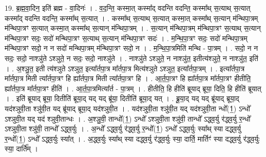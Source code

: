 \documentclass[17pt]{extarticle}
\begin{document}
19. ब्र॒ह्म॒वा॒दिन॒ इति॑ ब्रह्म - वा॒दिनः॑ । . व॒द॒न्ति॒ कस्मा॒त् कस्मा᳚द् वदन्ति वदन्ति॒ कस्मा᳚थ् स॒त्याथ् स॒त्यात् कस्मा᳚द् वदन्ति वदन्ति॒ कस्मा᳚थ् स॒त्यात् । . कस्मा᳚थ् स॒त्याथ् स॒त्यात् कस्मा॒त् कस्मा᳚थ् स॒त्यान् म॑न्थिपा॒त्रम् म॑न्थिपा॒त्रꣳ स॒त्यात् कस्मा॒त् कस्मा᳚थ् स॒त्यान् म॑न्थिपा॒त्रम् । . स॒त्यान् म॑न्थिपा॒त्रम् म॑न्थिपा॒त्रꣳ स॒त्याथ् स॒त्यान् म॑न्थिपा॒त्रꣳ सदः॒ सदो॑ मन्थिपा॒त्रꣳ स॒त्याथ् स॒त्यान् म॑न्थिपा॒त्रꣳ सदः॑ । . म॒न्थि॒पा॒त्रꣳ सदः॒ सदो॑ मन्थिपा॒त्रम् म॑न्थिपा॒त्रꣳ सदो॒ न न सदो॑ मन्थिपा॒त्रम् म॑न्थिपा॒त्रꣳ सदो॒ न । . म॒न्थि॒पा॒त्रमिति॑ मन्थि - पा॒त्रम् । . सदो॒ न न सदः॒ सदो॒ नाश्ञु॑ते ऽश्ञुते॒ न सदः॒ सदो॒ नाश्ञु॑ते । . नाश्ञु॑ते ऽश्ञुते॒ न नाश्ञु॑त॒ इतीत्य॑श्ञुते॒ न नाश्ञु॑त॒ इति॑ । . अ॒श्ञु॒त॒ इती त्य॑श्ञुते ऽश्ञुत॒ इत्या᳚र्तपा॒त्र मा᳚र्तपा॒त्र मित्य॑श्ञुते ऽश्ञुत॒ इत्या᳚र्तपा॒त्रम् । . इत्या᳚र्तपा॒त्र मा᳚र्तपा॒त्र मिती त्या᳚र्तपा॒त्रꣳ हि ह्या᳚र्तपा॒त्र मिती त्या᳚र्तपा॒त्रꣳ हि । . आ॒र्त॒पा॒त्रꣳ हि ह्या᳚र्तपा॒त्र मा᳚र्तपा॒त्रꣳ हीतीति॒ ह्या᳚र्तपा॒त्र मा᳚र्तपा॒त्रꣳ हीति॑ । . आ॒र्त॒पा॒त्रमित्या᳚र्त - पा॒त्रम् । . हीतीति॒ हि हीति॑ ब्रूयाद् ब्रूया॒ दिति॒ हि हीति॑ ब्रूयात् । . इति॑ ब्रूयाद् ब्रूया॒ दितीति॑ ब्रूया॒द् यद् यद् ब्रू॑या॒ दितीति॑ ब्रूया॒द् यत् । . ब्रू॒या॒द् यद् यद् ब्रू॑याद् ब्रूया॒द् यद॑श्ञुवी॒ता श्ञु॑वी॒त यद् ब्रू॑याद् ब्रूया॒द् यद॑श्ञुवी॒त । . यद॑श्ञुवी॒ता श्ञु॑वी॒त यद् यद॑श्ञुवी॒ता न्धो᳚(1॒) ऽन्धो᳚ ऽश्ञुवी॒त यद् यद॑ श्ञुवी॒तान्धः । . अ॒श्ञु॒वी॒ तान्धो᳚(1॒) ऽन्धो᳚ ऽश्ञुवी॒ता श्ञु॑वी॒ तान्धो᳚ ऽद्ध्व॒र्यु र॑द्ध्व॒र्यु र॒न्धो᳚ ऽश्ञुवी॒ता श्ञु॑वी॒ तान्धो᳚ ऽद्ध्व॒र्युः । . अ॒न्धो᳚ ऽद्ध्व॒र्यु र॑द्ध्व॒र्यु र॒न्धो᳚(1॒) ऽन्धो᳚ ऽद्ध्व॒र्युः स्या᳚थ् स्या दद्ध्व॒र्यु र॒न्धो᳚(1॒) ऽन्धो᳚ ऽद्ध्व॒र्युः स्या᳚त् । . अ॒द्ध्व॒र्युः स्या᳚थ् स्या दद्ध्व॒र्यु र॑द्ध्व॒र्युः स्या॒ दार्ति॒ मार्तिꣳ॑ स्या दद्ध्व॒र्यु र॑द्ध्व॒र्युः स्या॒ दार्ति᳚म् । \newline
\end{document}
